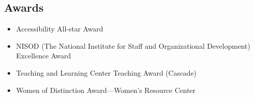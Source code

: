 \begin{widepage}
\begin{multicols*}{2}
\section*{Awards}

\begin{itemize}
\item Accessibility All-star Award
\item NISOD (The National Institute for Staff and Organizational Development) Excellence Award
\item Teaching and Learning Center Teaching Award (Cascade)
\item Women of Distinction Award---Women's Resource Center
\end{itemize}
\end{multicols*}
\end{widepage}